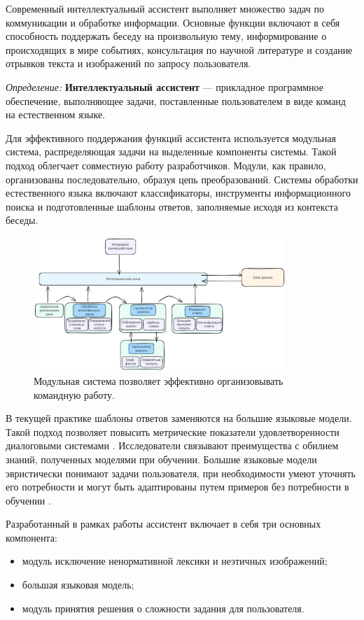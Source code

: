 Современный интеллектуальный ассистент выполняет множество задач по коммуникации и обработке информации.
Основные функции включают в себя способность поддержать беседу на произвольную тему, 
информирование о происходящих в мире событиях, консультация по научной литературе и создание 
отрывков текста и изображений по запросу пользователя. 

\textit{Определение:} \textbf{Интеллектуальный ассистент} --- прикладное программное обеспечение,
выполняющее задачи, поставленные пользователем в виде команд на естественном языке. 

Для эффективного поддержания функций ассистента используется модульная система, 
распределяющая задачи на выделенные компоненты системы. Такой подход облегчает совместную работу разработчиков.
 Модули, как правило, организованы последовательно, образуя цепь преобразований. 
Системы обработки естественного языка включают классификаторы, инструменты информационного поиска и 
подготовленные шаблоны ответов, заполняемые исходя из контекста беседы.
\begin{figure}[h]
    \centering
    \includegraphics[width=0.85\textwidth]{assets/work/arch/modern_system.excalidraw.png}
    \caption{Модульная система позволяет эффективно организовывать командную работу.}
    \label{modular}
\end{figure}
В текущей практике шаблоны ответов заменяются на большие языковые модели. Такой подход позволяет повысить метрические показатели
удовлетворенности диалоговыми системами \cite{zhao2023survey}. Исследователи связывают преимущества с обилием знаний, полученных моделями при обучении.
Большие языковые модели эвристически понимают задачи пользователя, при необходимости умеют уточнять его потребности и 
могут быть адаптированы путем примеров без потребности в обучении \cite{wang2020generalizing}.

Разработанный в рамках работы ассистент включает в себя три основных компонента:
 \begin{itemize}
    \item модуль исключение ненормативной лексики и неэтичных изображений;
    \item большая языковая модель;
    \item модуль принятия решения о сложности задания для пользователя.
\end{itemize}

